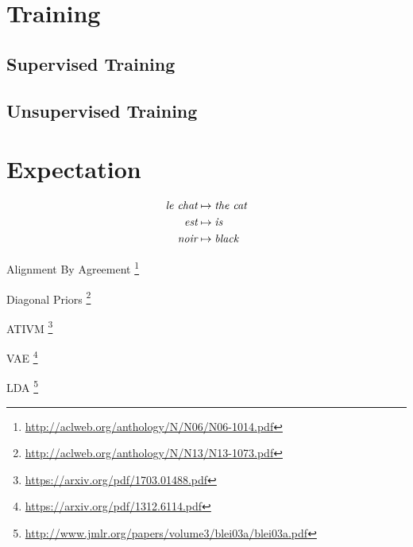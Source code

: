 \documentclass[twoside,twocolumn]{article}
\begin{document}
\section{Training}

\subsection{Supervised Training}

\subsection{Unsupervised Training}

\section{Expectation}


\begin{equation}
\centering
\begin{split}
\textit{le chat} &\mapsto \textit{the cat} \\
\textit{est} &\mapsto \textit{is} \\
\textit{noir} &\mapsto \textit{black} \\
\end{split}
\end{equation}


Alignment By Agreement \footnote{\url{http://aclweb.org/anthology/N/N06/N06-1014.pdf}} 

Diagonal Priors \footnote{\url{http://aclweb.org/anthology/N/N13/N13-1073.pdf}} 

ATIVM \footnote{\url{https://arxiv.org/pdf/1703.01488.pdf}} 

VAE \footnote{\url{https://arxiv.org/pdf/1312.6114.pdf}} 

LDA \footnote{\url{http://www.jmlr.org/papers/volume3/blei03a/blei03a.pdf}} 
\end{document}
